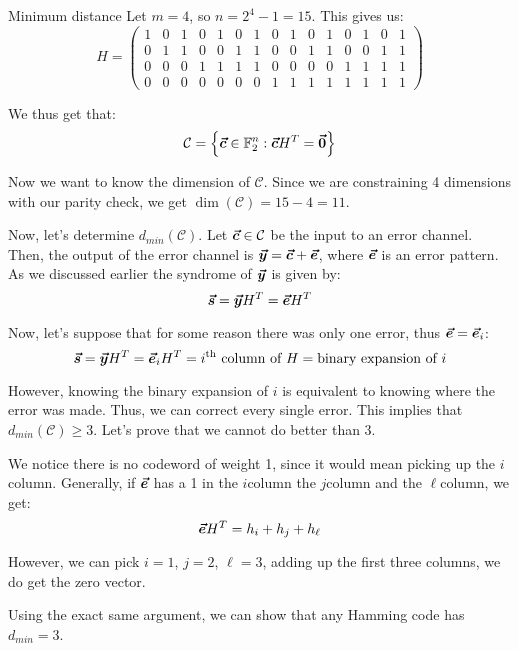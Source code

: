 \documentclass[a4paper]{article}
\begin{document}
\begin{parag}{Minimum distance}
    Let $m = 4$, so $n = 2^4 - 1 = 15$. This gives us:
    \setcounter{MaxMatrixCols}{20}  %
    \[H = \begin{pmatrix} 1 & 0 & 1 & 0 & 1 & 0 & 1 & 0 & 1 & 0 & 1 & 0 & 1 & 0 & 1 \\ 0 & 1 & 1 & 0 & 0 & 1 & 1 & 0 & 0 & 1 & 1 & 0 & 0 & 1 & 1 \\ 0 & 0 & 0 & 1 & 1 & 1 & 1 & 0 & 0 & 0 & 0 & 1 & 1 & 1 & 1 \\ 0 & 0 & 0 & 0 & 0 & 0 & 0 & 1 & 1 & 1 & 1 & 1 & 1 & 1 & 1 \end{pmatrix} \]
    \setcounter{MaxMatrixCols}{10}
    
    We thus get that:
    \[\mathcal{C} = \left\{\bvec{c} \in \mathbb{F}_2^n : \bvec{c} H^T = \bvec{0}\right\}\]

    Now we want to know the dimension of $\mathcal{C}$. Since we are constraining 4 dimensions with our parity check, we get $\dim\left(\mathcal{C}\right) = 15 - 4 = 11$.

    Now, let's determine $d_{min}\left(\mathcal{C}\right)$. Let $\bm{\protect\vec{c}} \in \mathcal{C}$ be the input to an error channel. Then, the output of the error channel is $\bm{\protect\vec{y}} = \bm{\protect\vec{c}} + \bm{\protect\vec{e}}$, where $\bm{\protect\vec{e}}$ is an error pattern. As we discussed earlier the syndrome of $\bm{\protect\vec{y}}$ is given by:
    \[\bm{\protect\vec{s}} = \bm{\protect\vec{y}} H^T = \bm{\protect\vec{e}} H^T\]

    Now, let's suppose that for some reason there was only one error, thus $\bm{\protect\vec{e}} = \bm{\protect\vec{e}}_i$: 
    \[\bm{\protect\vec{s}} = \bm{\protect\vec{y}} H^T = \bm{\protect\vec{e}}_i H^T = i^{\text{th}} \text{ column of $H$} = \text{binary expansion of $i$}\]
    
    However, knowing the binary expansion of $i$ is equivalent to knowing where the error was made. Thus, we can correct every single error. This implies that $d_{min}\left(\mathcal{C}\right) \geq 3$. Let's prove that we cannot do better than 3. 

    We notice there is no codeword of weight 1, since it would mean picking up the $i$\Th column. Generally, if $\bm{\protect\vec{e}}$ has a 1 in the $i$\Th column the $j$\Th column and the $\ell $\Th column, we get: 
    \[\bm{\protect\vec{e}}H^T = h_i + h_j + h_\ell \]
    
    However, we can pick $i = 1$, $j = 2$, $\ell = 3$, adding up the first three columns, we do get the zero vector.

    Using the exact same argument, we can show that any Hamming code has $d_{min} = 3$.
\end{parag}
\end{document}
